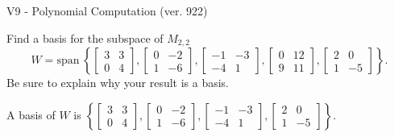 \begin{exercise}
  \begin{exerciseTitle}V9 - Polynomial Computation (ver. 922)\end{exerciseTitle}
  \begin{exerciseStatement}
    Find a basis for the subspace of \(M_{2,2}\) 
\[W=\mathrm{span}\ \left\{\left[\begin{array}{cc}
3 & 3 \\
0 & 4
\end{array}\right] , \left[\begin{array}{cc}
0 & -2 \\
1 & -6
\end{array}\right] , \left[\begin{array}{cc}
-1 & -3 \\
-4 & 1
\end{array}\right] , \left[\begin{array}{cc}
0 & 12 \\
9 & 11
\end{array}\right] , \left[\begin{array}{cc}
2 & 0 \\
1 & -5
\end{array}\right]\right\}.\]
 Be sure to explain why your result is a basis.


  \end{exerciseStatement}
  \begin{exerciseAnswer}
   A basis of \(W\) is  \(\left\{\left[\begin{array}{cc}
3 & 3 \\
0 & 4
\end{array}\right] , \left[\begin{array}{cc}
0 & -2 \\
1 & -6
\end{array}\right] , \left[\begin{array}{cc}
-1 & -3 \\
-4 & 1
\end{array}\right] , \left[\begin{array}{cc}
2 & 0 \\
1 & -5
\end{array}\right]\right\}\).
  


  \end{exerciseAnswer}
\end{exercise}